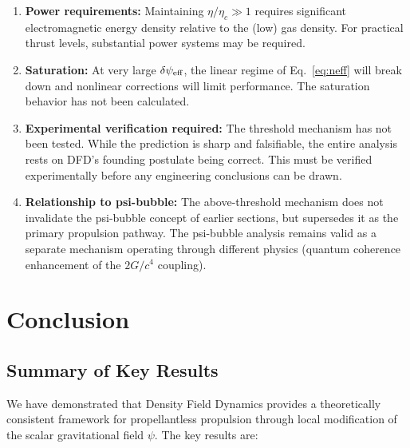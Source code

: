 \documentclass[twocolumn,prl,superscriptaddress,nofootinbib,longbibliography,floatfix]{revtex4-2}
\begin{document}
\begin{enumerate}[label=(\roman*)]
\item \textbf{Power requirements:} Maintaining $\eta/\eta_c \gg 1$
requires significant electromagnetic energy density relative to the
(low) gas density.  For practical thrust levels, substantial power
systems may be required.

\item \textbf{Saturation:} At very large $\delta\psi_{\rm eff}$, the
linear regime of Eq.~\eqref{eq:neff} will break down and nonlinear
corrections will limit performance.  The saturation behavior has not
been calculated.

\item \textbf{Experimental verification required:} The threshold
mechanism has not been tested.  While the prediction is sharp and
falsifiable, the entire analysis rests on DFD's founding postulate
being correct.  This must be verified experimentally before any
engineering conclusions can be drawn.

\item \textbf{Relationship to psi-bubble:} The above-threshold
mechanism does not invalidate the psi-bubble concept of earlier
sections, but supersedes it as the primary propulsion pathway.  The
psi-bubble analysis remains valid as a separate mechanism operating
through different physics (quantum coherence enhancement of the
$2G/c^4$ coupling).
\end{enumerate}

\section{Conclusion}\label{sec:conclusion}

\subsection{Summary of Key Results}

We have demonstrated that Density Field Dynamics provides a
theoretically consistent framework for propellantless propulsion through
local modification of the scalar gravitational field $\psi$.  The key
results are:
\end{document}
